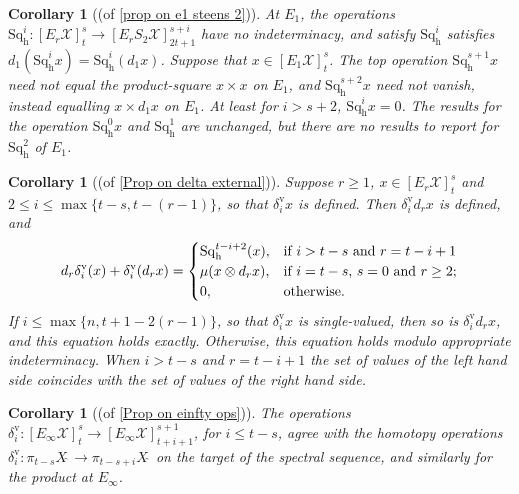 \documentclass[11pt]{amsart} \renewcommand{\baselinestretch}{1.4}
\theoremstyle{plain}
\newtheorem{cor}[thm]{Corollary}
\theoremstyle{definition}
\renewcommand{\to}{\longrightarrow}
\newcommand{\calx}{\mathcal{X}}
\newcommand{\Sq}{\mathrm{Sq}}
\newcommand{\E}[5]{[E^{#1}_{#2}#3]^{#4}_{#5}}
\newcommand{\Edownup}[5]{[E_{#1}^{#2}#3]^{#4}_{#5}}
\newcommand{\uver}{^\mathrm{v}}
\newcommand{\dhor}{_\mathrm{h}}
\newcommand{\Sqh}{\mathrm{Sq}\dhor}
\newcommand{\deltav}{\delta\uver}
\begin{document}
\begin{Operations on the Bousfield-Kan spectral sequence}
\begin{cor}[(of \ref{prop on e1 steens 2})]
\label{prop on e1 steens 2 composed with lift}
At $E_1$, the operations $\Sq\dhor^i:\Edownup{r}{}{\calx}{s}{t}\to \Edownup{r}{}{S_2\calx}{s+i}{2t+1}$ have no indeterminacy, and satisfy $\Sqh^i$ satisfies $d_{1}(\Sqh^ix)=\Sqh^{i}(d_1x)$. Suppose that $x\in \Edownup{1}{}{\calx}{s}{t}$.
The top operation $\Sqh^{s+1}x$ \emph{need not} equal the product-square $x\times x$ on $E_1$, and
$\Sqh^{s+2}x$ \emph{need not} vanish, instead equalling $x\times d_1x$ on $E_1$.
At least for $i>s+2$, $\Sqh^ix=0$. The results for the operation $\Sqh^0x$ and $\Sqh^{1}$ are unchanged, but there are no results to report for $\Sqh^{2}$ of $E_1$.
\end{cor}

\begin{cor}[(of \ref{Prop on delta external})]
\label{Prop on delta external composed with lift}
Suppose $r\geq1$, $x\in \E{}{r}{\calx}{s}{t}$ and $2\leq i\leq \max\{t-s,t-(r-1)\}$, so that $\deltav_ix $ is defined. Then $\deltav_i d_r x$ is defined, and 
\[d_r\deltav_i(x)+ \deltav_i(d_rx)=\begin{cases}
\Sqh^{t-i+2}(x),&\textup{if $i>t-s$ and $r =t-i+1$}\\
\mu(x\otimes d_rx),&\textup{if $i=t-s$,  $s=0$ and $r\geq2$};\\
0,&\textup{otherwise.}
\end{cases}\]
If $i\leq \max\{n,t+1-2(r-1)\}$, so that $\deltav_i x$ is single-valued, then so is $\deltav_i d_r x$, and this equation holds exactly. Otherwise, this equation holds modulo appropriate indeterminacy. When $i>t-s$ and $r =t-i+1$ the set of values of the left hand side coincides with the set of values of the right hand side.
\end{cor}

\begin{cor}[(of \ref{Prop on einfty ops})]
\label{Prop on einfty ops composed with lift}
The operations $\deltav_i:\E{}{\infty}{\calx}{s}{t}\to \E{}{\infty}{\calx}{s+1}{t+i+1}$, for $i\leq t-s$, agree with the homotopy operations $\deltav_i:\pi_{t-s}X\hat{\ }\to \pi_{t-s+i}X\hat{\ }$ on the target of the spectral sequence, and similarly for the product at $E_\infty$.
\end{cor}




\end{Operations on the Bousfield-Kan spectral sequence}
\end{document}
